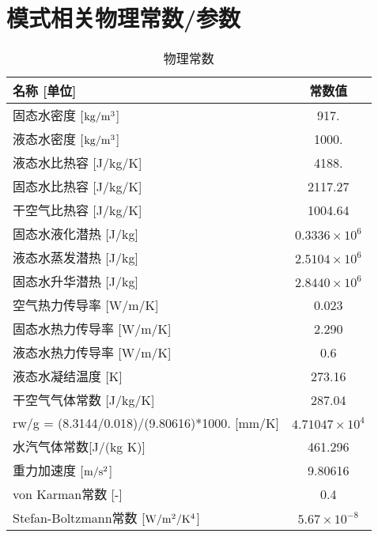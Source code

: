 \chapter{模式相关物理常数/参数}\label{模式相关物理常数参数}
\begin{table}[]
    \centering
    \caption{物理常数}
    \label{tab:物理常数}
    \begin{tabular}{@{}lc@{}}
    \toprule
    名称 {[}单位{]}                                      & 常数值         \\ \midrule
    固态水密度 {[}$\rm kg/m^3${]}                                & 917.        \\
    液态水密度 {[}$\rm kg/m^3${]}                                & 1000.       \\
    液态水比热容 {[}J/kg/K{]}                              & 4188.       \\
    固态水比热容 {[}J/kg/K{]}                              & 2117.27     \\
    干空气比热容 {[}J/kg/K{]}                              & 1004.64     \\
    固态水液化潜热 {[}J/kg{]}                               & $0.3336\times 10^6$  \\
    液态水蒸发潜热 {[}J/kg{]}                               & $2.5104\times 10^6$  \\
    固态水升华潜热 {[}J/kg{]}                               & $2.8440\times 10^6$  \\
    空气热力传导率 {[}W/m/K{]}                              & 0.023       \\
    固态水热力传导率 {[}W/m/K{]}                             & 2.290       \\
    液态水热力传导率 {[}W/m/K{]}                             & 0.6         \\
    液态水凝结温度 {[}K{]}                                  & 273.16      \\
    干空气气体常数 {[}J/kg/K{]}                             & 287.04      \\
    rw/g = (8.3144/0.018)/(9.80616)*1000. {[}mm/K{]} & $4.71047\times 10^4$ \\
    水汽气体常数{[}J/(kg K){]}                             & 461.296     \\
    重力加速度 {[}$\rm m/s^2${]}                                 & 9.80616     \\
    von Karman常数 {[}-{]}                             & 0.4         \\
    Stefan-Boltzmann常数 {[}$\rm W/m^2/K^4${]}                 & $5.67 \times 10^{-8}$   \\\bottomrule
    \end{tabular}
\end{table}

